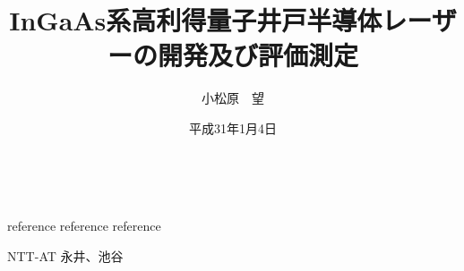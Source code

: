 \documentclass{jreport}
\title{InGaAs系高利得量子井戸半導体レーザーの開発及び評価測定}
\author{小松原　望}
\date{平成31年1月4日}
\begin{document}
\maketitle			%

\tableofcontents 	%
\listoffigures 		%
\listoftables　		%


\begin{thebibliography}{99}
 reference
 reference
 reference
%
\end{thebibliography}




NTT-AT 永井、池谷
\end{document}
